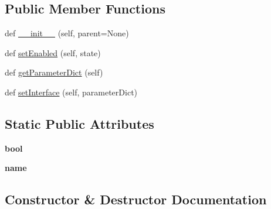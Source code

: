 \subsection*{Public Member Functions}
\begin{DoxyCompactItemize}
\item 
def \mbox{\hyperlink{class_dsg_tools_1_1_custom_widgets_1_1button_prop_widget_1_1_button_prop_widget_af55754fa68c68fe67a6b15c711f0abcd}{\+\_\+\+\_\+init\+\_\+\+\_\+}} (self, parent=None)
\item 
def \mbox{\hyperlink{class_dsg_tools_1_1_custom_widgets_1_1button_prop_widget_1_1_button_prop_widget_a383e59fb5ca1bb61e10bd0045eaea03b}{set\+Enabled}} (self, state)
\item 
def \mbox{\hyperlink{class_dsg_tools_1_1_custom_widgets_1_1button_prop_widget_1_1_button_prop_widget_a73f5148b469c27df8733366f503a280e}{get\+Parameter\+Dict}} (self)
\item 
def \mbox{\hyperlink{class_dsg_tools_1_1_custom_widgets_1_1button_prop_widget_1_1_button_prop_widget_ad7d9be677c43761641c97358ef9aad45}{set\+Interface}} (self, parameter\+Dict)
\end{DoxyCompactItemize}
\subsection*{Static Public Attributes}
\begin{DoxyCompactItemize}
\item 
\mbox{\label{class_dsg_tools_1_1_custom_widgets_1_1button_prop_widget_1_1_button_prop_widget_a3b23f59a91eed46f55e4fdc756ebfbde}} 
{\bfseries bool}
\item 
\mbox{\label{class_dsg_tools_1_1_custom_widgets_1_1button_prop_widget_1_1_button_prop_widget_a6cfa8b6b211280e8b5d19b120c569812}} 
{\bfseries name}
\end{DoxyCompactItemize}


\subsection{Constructor \& Destructor Documentation}
\mbox{\label{class_dsg_tools_1_1_custom_widgets_1_1button_prop_widget_1_1_button_prop_widget_af55754fa68c68fe67a6b15c711f0abcd}} 
